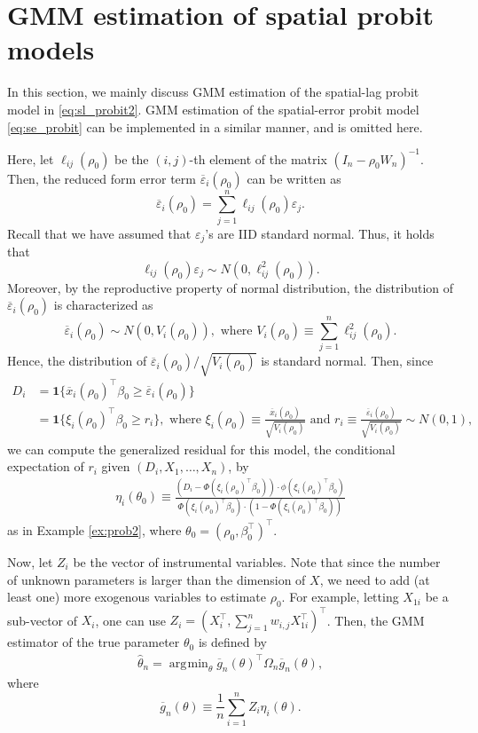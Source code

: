 \documentclass[10.5pt, A4paper, openany, uplatex]{book}
\newcommand{\mbf}{\mathbf}
\newcommand{\eps}{\varepsilon}
\renewcommand{\hat}{\widehat}
\renewcommand{\bar}{\overline}
\numberwithin{equation}{section}
\DeclareMathOperator*{\argmin}{\arg\!\min}
\begin{document}
\section{GMM estimation of spatial probit models}\label{sec:spGMM}

In this section, we mainly discuss GMM estimation of the spatial-lag probit model in \eqref{eq:sl_probit2}.
GMM estimation of the spatial-error probit model \eqref{eq:se_probit} can be implemented in a similar manner, and is omitted here.

Here, let $\ell_{ij}(\rho_0)$ be the $(i,j)$-th element of the matrix $(I_n - \rho_0 W_n)^{-1}$.
Then, the reduced form error term $\bar{\eps}_{i}(\rho_0)$ can be written as
\[
	\bar{\eps}_{i}(\rho_0) = \sum_{j=1}^n\ell_{ij}(\rho_0)\eps_j.
\]
Recall that we have assumed that $\eps_j$'s are IID standard normal.
Thus, it holds that
\[
	\ell_{ij}(\rho_0)\eps_j \sim N(0, \ell^2_{ij}(\rho_0)).
\]
Moreover, by the reproductive property of normal distribution, the distribution of $\bar{\eps}_{i}(\rho_0)$ is characterized as
\[
	\bar{\eps}_{i}(\rho_0) \sim N(0, V_i(\rho_0)), \text{ where } V_i(\rho_0) \equiv \sum_{j=1}^n\ell^2_{ij}(\rho_0).
\] 
Hence, the distribution of $\bar{\eps}_{i}(\rho_0)/\sqrt{V_i(\rho_0)}$ is standard normal.
Then, since
\begin{align*}
	D_i 
	& = \mbf{1}\{\bar x_i(\rho_0)^\top \beta_0 \ge  \bar \eps_i(\rho_0)\} \\
	& = \mbf{1}\{\xi_i(\rho_0)^\top \beta_0 \ge  r_i \}, \text{ where } \xi_i(\rho_0) \equiv \frac{\bar x_i(\rho_0)}{\sqrt{V_i(\rho_0)}} \text{ and } r_i \equiv \frac{\bar{\eps}_{i}(\rho_0)}{\sqrt{V_i(\rho_0)}} \sim N(0,1),
\end{align*}
we can compute the generalized residual for this model, the conditional expectation of $r_i$ given $(D_i, X_1, \ldots , X_n)$, by 
\begin{align*}
	\eta_i(\theta_0) \equiv \frac{(D_i - \Phi(\xi_i(\rho_0)^\top \beta_0)) \cdot \phi(\xi_i(\rho_0)^\top \beta_0)}{\Phi(\xi_i(\rho_0)^\top \beta_0) \cdot (1 - \Phi(\xi_i(\rho_0)^\top \beta_0) )}
\end{align*}
as in Example \ref{ex:prob2}, where $\theta_0 = (\rho_0, \beta_0^\top)^\top$.

Now, let $Z_i$ be the vector of instrumental variables.
Note that since the number of unknown parameters is larger than the dimension of $X$, we need to add (at least one) more exogenous variables to estimate $\rho_0$.
For example, letting $X_{1i}$ be a sub-vector of $X_i$, one can use $Z_i = (X^\top_i, \sum_{j=1}^n w_{i,j} X_{1i}^\top)^\top$. Then, the GMM estimator of the true parameter $\theta_0$ is defined by
\begin{align}\label{eq:spGMM}
\hat{\theta}_n = \argmin_{\theta} \bar{g}_n(\theta)^\top \Omega_n \bar{g}_n(\theta),
\end{align}
 where 
\[
	\bar{g}_n(\theta) \equiv \frac{1}{n}\sum_{i=1}^n Z_i \eta_i(\theta).
\]
\end{document}

